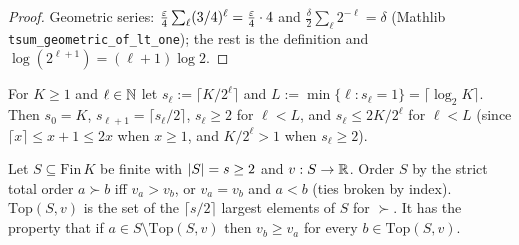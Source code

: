 \begin{proof}
\leanok
{}
Geometric series: $\frac{\varepsilon}4\sum_\ell(3/4)^\ell = \frac{\varepsilon}4\cdot4$ and
$\frac\delta2\sum_\ell 2^{-\ell} = \delta$ (Mathlib \texttt{tsum\_geometric\_of\_lt\_one}); the
rest is the definition and $\log(2^{\ell+1}) = (\ell+1)\log2$.
\end{proof}

\begin{definition}\label{def:pm_halving}
\leanok
For $K\ge1$ and $\ell\in\mathbb{N}$ let $s_\ell := \lceil K/2^\ell\rceil$ and
$L := \min\{\ell : s_\ell = 1\} = \lceil\log_2K\rceil$. Then $s_0 = K$,
$s_{\ell+1} = \lceil s_\ell/2\rceil$, $s_\ell\ge2$ for $\ell<L$, and $s_\ell\le 2K/2^\ell$ for
$\ell<L$ (since $\lceil x\rceil\le x+1\le 2x$ when $x\ge1$, and $K/2^\ell>1$ when $s_\ell\ge2$).
\end{definition}

\begin{definition}\label{def:pm_top}
\leanok
Let $S\subseteq\mathrm{Fin}\,K$ be finite with $\lvert S \rvert = s\ge2$ and $v : S\to\mathbb{R}$. Order $S$ by the
strict total order $a\succ b$ iff $v_a>v_b$, or $v_a = v_b$ and $a<b$ (ties broken by index).
$\mathrm{Top}(S,v)$ is the set of the $\lceil s/2\rceil$ largest elements of $S$ for $\succ$.
It has the property that if $a\in S\setminus\mathrm{Top}(S,v)$ then $v_b\ge v_a$ for every
$b\in\mathrm{Top}(S,v)$.
\end{definition}

